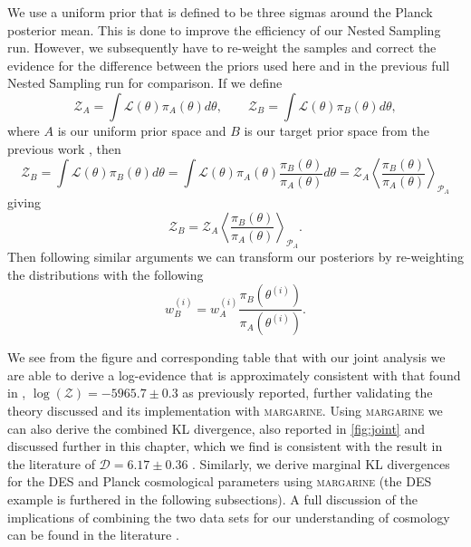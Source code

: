We use a uniform prior that is defined to be three sigmas around the Planck posterior mean. This is done to improve the efficiency of our Nested Sampling run. However, we subsequently have to re-weight the samples and correct the evidence for the difference between the priors used here and in the previous full Nested Sampling run \cite{Handley_tensions_2019} for comparison. If we define
\begin{equation}
    \mathcal{Z}_A = \int \mathcal{L}(\theta) \pi_A(\theta) d\theta, \qquad
    \mathcal{Z}_B = \int \mathcal{L}(\theta) \pi_B(\theta) d\theta, 
\end{equation}
where $A$ is our uniform prior space and $B$ is our target prior space from the previous work \cite{Handley_tensions_2019}, then
\begin{equation}
    \mathcal{Z}_B 
    = \int \mathcal{L}(\theta) \pi_B(\theta) d\theta
    = \int \mathcal{L}(\theta) {\pi_A(\theta)}\frac{\pi_B(\theta)}{\pi_A(\theta)} d\theta 
   = \mathcal{Z}_A\left\langle \frac{\pi_B(\theta)}{\pi_A(\theta)}\right\rangle_{\mathcal{P}_A}
\end{equation}
giving
\begin{equation}
    \mathcal{Z}_B 
    = \mathcal{Z}_A\left\langle \frac{\pi_B(\theta)}{\pi_A(\theta)}\right\rangle_{\mathcal{P}_A}.
\end{equation}
Then following similar arguments we can transform our posteriors by re-weighting the distributions with the following
\begin{equation}
    w^{(i)}_B 
    = w^{(i)}_A  \frac{\pi_B(\theta^{(i)})}{\pi_A(\theta^{(i)})}.
\end{equation}

We see from the figure and corresponding table that with our joint analysis we are able to derive a log-evidence that is approximately consistent with that found in \cite{Handley_tensions_2019}, $\log(\mathcal{Z}) = -5965.7 \pm 0.3$ as previously reported, further validating the theory discussed and its implementation with \textsc{margarine}. %
Using \textsc{margarine} we can also derive the combined KL divergence, also reported in \cref{fig:joint} and discussed further in this chapter, which we find is consistent with the result in the literature of $\mathcal{D} = 6.17 \pm 0.36$ \cite{Handley_dimensionality_2019}. Similarly, we derive marginal KL divergences for the DES and Planck cosmological parameters using \textsc{margarine} (the DES example is furthered in the following subsections). A full discussion of the implications of combining the two data sets for our understanding of cosmology can be found in the literature \cite[e.g][]{Handley_tensions_2019, Handley_dimensionality_2019}.

